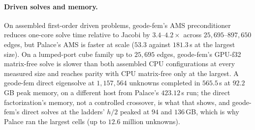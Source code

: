 \documentclass{anvil-paper}
\begin{document}
\paragraph{Driven solves and memory.}
On assembled first-order driven problems, geode-fem's AMS preconditioner
\citep{hiptmair-xu,tzaniovkolevpanayotsvassilevski2018parallel} reduces
one-core solve time relative to Jacobi by $3.4$--$4.2\times$ across
$25{,}695$--$897{,}650$ edges, but Palace's AMS is faster at scale
($53.3$ against $181.3$\,s at the largest size). On a lumped-port cube
family up to $25{,}695$ edges, geode-fem's GPU-f32 matrix-free solve is
slower than both assembled CPU configurations at every measured size and
reaches parity with CPU matrix-free only at the largest. A geode-fem
direct eigensolve at $1{,}157{,}564$ unknowns completed in $565.5$\,s at
$92.2$\,GB peak memory, on a different host from Palace's $423.12$\,s run;
the direct factorization's memory, not a controlled crossover, is what
that shows, and geode-fem's direct solves at the ladders' $h/2$ peaked at
$94$ and $136$\,GB, which is why Palace ran the largest cells (up to
$12.6$ million unknowns).

\clearpage



\end{document}
